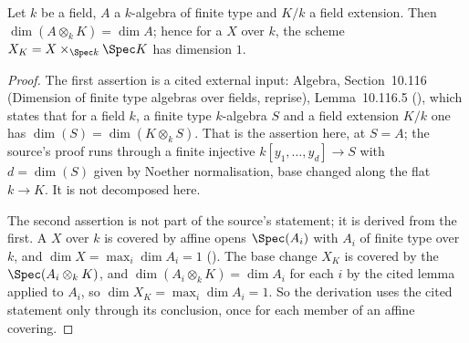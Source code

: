 \begin{lemma}
\label{lem:pc-dim-base-change}
Let $k$ be a field, $A$ a $k$-algebra of finite type and $K/k$ a field
extension.  Then $\dim(A\otimes_kK)=\dim A$; hence for a
 $X$ over $k$, the scheme
$X_K=X\times_{\Spec k}\Spec K$ has dimension $1$.
\end{lemma}
\begin{proof}
The first assertion is a cited external input: Algebra,
Section~10.116 (Dimension of finite type algebras over fields,
reprise), Lemma~10.116.5 (), which states that for
a field $k$, a finite type $k$-algebra $S$ and a field extension $K/k$
one has $\dim(S)=\dim(K\otimes_kS)$.  That is the assertion here, at
$S=A$; the source's proof runs through a finite injective
$k[y_1,\dots,y_d]\to S$ with $d=\dim(S)$ given by Noether
normalisation, base changed along the flat $k\to K$.  It is not
decomposed here.

The second assertion is not part of the source's statement; it is
derived from the first.  A  $X$ over $k$
is covered by affine opens $\Spec(A_i)$ with $A_i$ of finite type over
$k$, and $\dim X=\max_i\dim A_i=1$ ().  The
base change $X_K$ is covered by the $\Spec(A_i\otimes_kK)$, and
$\dim(A_i\otimes_kK)=\dim A_i$ for each $i$ by the cited lemma applied
to $A_i$, so $\dim X_K=\max_i\dim A_i=1$.  So the derivation uses the
cited statement only through its conclusion, once for each member of an
affine covering.
\end{proof}

